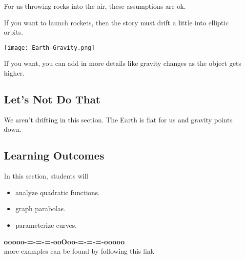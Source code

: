 \documentclass{ximera}
\begin{document}
For us throwing rocks into the air, these assumptions are ok.

If you want to launch rockets, then the story must drift a little into elliptic orbits.  




\begin{center}
\texttt{[image: Earth-Gravity.png]}
\end{center}


If you want, you can add in more details like gravity changes as the object gets higher.






\subsection*{Let's Not Do That}


We aren't drifting in this section.  The Earth is flat for us and gravity points down.















\subsection*{Learning Outcomes}





\begin{sectionOutcomes}
In this section, students will 

\begin{itemize}
\item analyze quadratic functions.
\item graph parabolas.
\item parameterize curves.
\end{itemize}
\end{sectionOutcomes}










\begin{center}
\textbf{\textcolor{green!50!black}{ooooo-=-=-=-ooOoo-=-=-=-ooooo}} \\

more examples can be found by following this link\\ 

\end{center}
\end{document}
